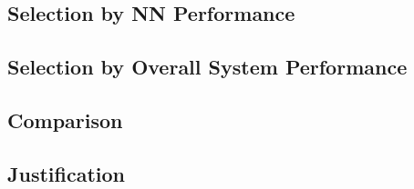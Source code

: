 \subsection{Selection by \gls{NN} Performance}

\subsection{Selection by Overall System Performance}

\subsection{Comparison}

\subsection{Justification}
